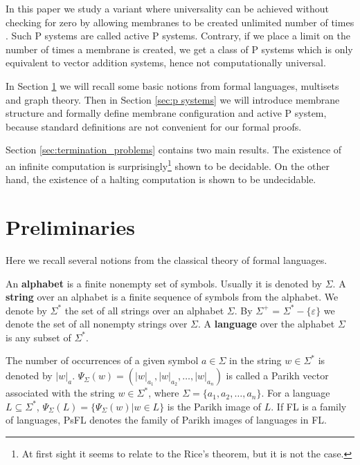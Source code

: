 \documentclass[llncs,submission,copyright,creativecommons]{../lib/lncs/llncs}
\def\eps{\varepsilon}
\begin{document}
In this paper we study a variant where universality can be achieved without checking for zero by allowing membranes to be created unlimited number of times \cite{Ibarra05Active}. Such P systems are called active P systems. Contrary, if we place a limit on the number of times a membrane is created, we get a class of P systems which is only equivalent to vector addition systems, hence not computationally universal.

In Section \ref{sec:preliminaries} we will recall some basic notions from formal languages, multisets and graph theory. Then in Section \ref{sec:p systems} we will introduce membrane structure and formally define membrane configuration and active P system, because standard definitions are not convenient for our formal proofs.

Section \ref{sec:termination_problems} contains two main results. The existence of an infinite computation is surprisingly\footnote{At first sight it seems to relate to the Rice's theorem, but it is not the case.} shown to be decidable.
On the other hand, the existence of a halting computation is shown to be undecidable.


\section{Preliminaries}
\label{sec:preliminaries}

Here we recall several notions from the classical theory of formal languages.

An {\bf alphabet} is a finite nonempty set of symbols. Usually it is denoted by $\Sigma$. A {\bf string} over an alphabet is a finite sequence of symbols from the alphabet. We denote by $\Sigma^*$ the set of all strings over an alphabet $\Sigma$. By $\Sigma^+$ = $\Sigma^* - \{\eps\}$ we denote the set of all nonempty strings over $\Sigma$. A {\bf language} over the alphabet $\Sigma$ is any subset of $\Sigma^*$.

The number of occurrences of a given symbol $a\in \Sigma$ in the string $w\in \Sigma^*$ is denoted by $|w|_a$. $\Psi_\Sigma(w)=(|w|_{a_1},|w|_{a_2},\dots,|w|_{a_n})$ is called a Parikh vector associated with the string $w\in \Sigma^*$, where $\Sigma=\{a_1,a_2,\dots, a_n\}$. For a language $L\subseteq \Sigma^*$, $\Psi_\Sigma(L)=\{\Psi_\Sigma(w)|w\in L\}$ is the Parikh image of $L$. If FL is a family of languages, PsFL denotes the family of Parikh images of languages in FL.
\end{document}
